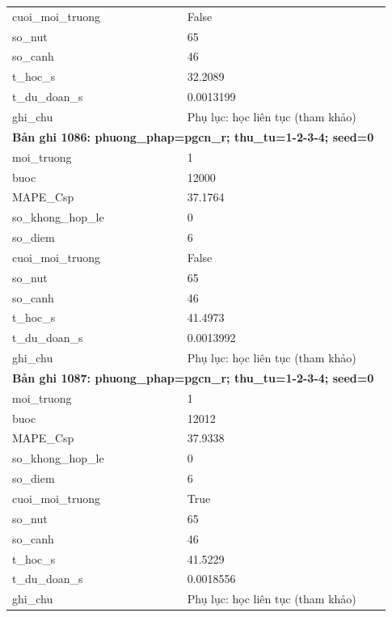 \begin{longtable}{p{0.43\linewidth}p{0.50\linewidth}}
cuoi\_\allowbreak moi\_\allowbreak truong & False \\
so\_\allowbreak nut & 65 \\
so\_\allowbreak canh & 46 \\
t\_\allowbreak hoc\_\allowbreak s & 32.2089 \\
t\_\allowbreak du\_\allowbreak doan\_\allowbreak s & 0.0013199 \\
ghi\_\allowbreak chu & Phụ lục: học liên tục (tham khảo) \\
\midrule
\multicolumn{2}{p{0.95\linewidth}}{\textbf{Bản ghi 1086: phuong\_phap=pgcn\_r; thu\_tu=1-2-3-4; seed=0}} \\
moi\_\allowbreak truong & 1 \\
buoc & 12000 \\
MAPE\_\allowbreak Csp & 37.1764 \\
so\_\allowbreak khong\_\allowbreak hop\_\allowbreak le & 0 \\
so\_\allowbreak diem & 6 \\
cuoi\_\allowbreak moi\_\allowbreak truong & False \\
so\_\allowbreak nut & 65 \\
so\_\allowbreak canh & 46 \\
t\_\allowbreak hoc\_\allowbreak s & 41.4973 \\
t\_\allowbreak du\_\allowbreak doan\_\allowbreak s & 0.0013992 \\
ghi\_\allowbreak chu & Phụ lục: học liên tục (tham khảo) \\
\midrule
\multicolumn{2}{p{0.95\linewidth}}{\textbf{Bản ghi 1087: phuong\_phap=pgcn\_r; thu\_tu=1-2-3-4; seed=0}} \\
moi\_\allowbreak truong & 1 \\
buoc & 12012 \\
MAPE\_\allowbreak Csp & 37.9338 \\
so\_\allowbreak khong\_\allowbreak hop\_\allowbreak le & 0 \\
so\_\allowbreak diem & 6 \\
cuoi\_\allowbreak moi\_\allowbreak truong & True \\
so\_\allowbreak nut & 65 \\
so\_\allowbreak canh & 46 \\
t\_\allowbreak hoc\_\allowbreak s & 41.5229 \\
t\_\allowbreak du\_\allowbreak doan\_\allowbreak s & 0.0018556 \\
ghi\_\allowbreak chu & Phụ lục: học liên tục (tham khảo) \\

\end{longtable}

